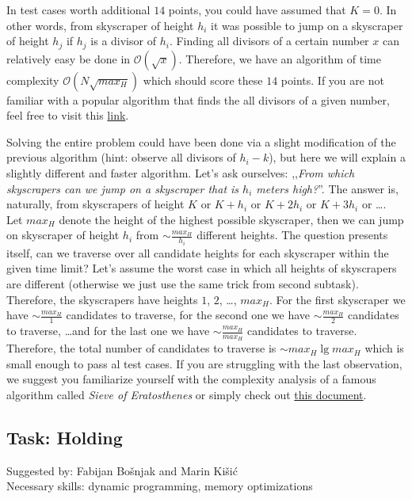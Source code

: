 \documentclass[a4paper]{article}
\begin{document}
In test cases worth additional $14$ points, you could have assumed that $K=0$.
In other words, from skyscraper of height $h_i$ it was possible to jump on
a skyscraper of height $h_j$ if $h_j$ is a divisor of $h_i$. Finding all divisors
of a certain number $x$ can relatively easy be done in $\mathcal{O}(\sqrt{x})$.
Therefore, we have an algorithm of time complexity $\mathcal{O}(N\sqrt{max_H})$
which should score these $14$ points. If you are not familiar with a popular
algorithm that finds the all divisors of a given number, feel free to visit
this \href{https://www.math.uh.edu/~minru/web/divis2.html}{link}.

Solving the entire problem could have been done via a slight modification of
the previous algorithm (hint: observe all divisors of $h_i - k$), but here we
will explain a slightly different and faster algorithm. Let's ask ourselves:
,,\textit{From which skyscrapers can we jump on a skyscraper that is $h_i$
meters high?}''. The answer is, naturally, from skyscrapers of height $K$ or $K
+ h_i$ or $K + 2h_i$ or $K + 3h_i$ or \dots. Let $max_H$ denote the height of
the highest possible skyscraper, then we can jump on skyscraper of height $h_i$
from $\sim \frac{max_H}{h_i}$ different heights. The question presents itself,
can we traverse over all candidate heights for each skyscraper within the given
time limit? Let's assume the worst case in which all heights of skyscrapers
are different (otherwise we just use the same trick from second subtask).
Therefore, the skyscrapers have heights $1$, $2$, \dots, $max_H$. For the first
skyscraper we have $\sim \frac{max_H}{1}$ candidates to traverse, for the
second one we have $\sim \frac{max_H}{2}$ candidates to traverse, \dots and for
the last one we have $\sim \frac{max_H}{max_H}$ candidates to traverse.
Therefore, the total number of candidates to traverse is $\sim max_H \lg max_H$
which is small enough to pass al test cases. If you are struggling with the
last observation, we suggest you familiarize yourself with the complexity
analysis of a famous algorithm called \textit{Sieve of Eratosthenes} or simply
check out
\href{https://www.cs.umd.edu/class/spring2016/cmsc351-0101/harmonic.pdf}{this
document}.

\subsection*{Task: Holding}
\textsf{Suggested by: Fabijan Bošnjak and Marin Kišić}\\
\textsf{Necessary skills: dynamic programming, memory optimizations}
\end{document}
